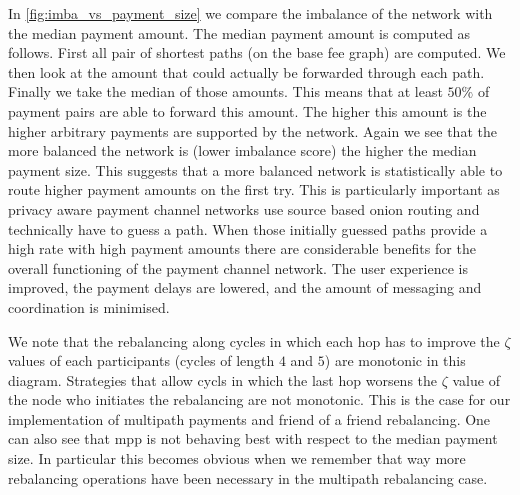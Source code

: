 \documentclass[a4paper]{paper}
\begin{document}
In \cref{fig:imba_vs_payment_size} we compare the imbalance of the network with the median payment amount.
The median payment amount is computed as follows.
First all pair of shortest paths (on the base fee graph) are computed.
We then look at the amount that could actually be forwarded through each path.
Finally we take the median of those amounts.
This means that at least $50\%$ of payment pairs are able to forward this amount.
The higher this amount is the higher arbitrary payments are supported by the network.
Again we see that the more balanced the network is (lower imbalance score) the higher the median payment size.
This suggests that a more balanced network is statistically able to route higher payment amounts on the first try.
This is particularly important as privacy aware payment channel networks use source based onion routing and technically have to guess a path.
When those initially guessed paths provide a high rate with high payment amounts there are considerable benefits for the overall functioning of the payment channel network. 
The user experience is improved, the payment delays are lowered, and the amount of messaging and coordination is minimised.

We note that the rebalancing along cycles in which each hop has to improve the $\zeta$ values of each participants (cycles of length $4$ and $5$) are monotonic in this diagram.
Strategies that allow cycls in which the last hop worsens the $\zeta$ value of the node who initiates the rebalancing are not monotonic.
This is the case for our implementation of multipath payments and friend of a friend rebalancing.
One can also see that mpp is not behaving best with respect to the median payment size.
In particular this becomes obvious when we remember that way more rebalancing operations have been necessary in the multipath rebalancing case.
\end{document}
